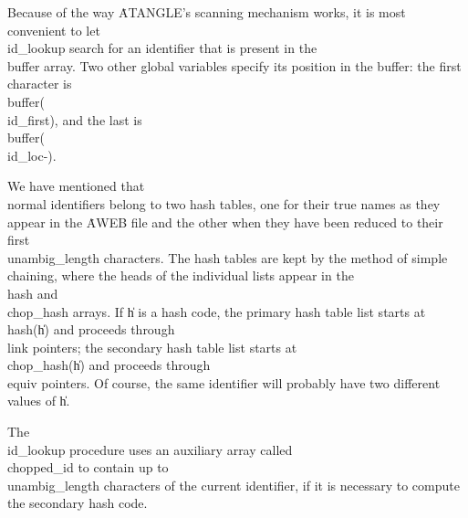 Because of the way \.{ATANGLE}'s scanning mechanism works, it is most
convenient to let \\{id\_lookup} search for an identifier that is present in
the
\\{buffer} array. Two other global variables specify its position in the
buffer: the first character is \\{buffer}\?(\?\\{id\_first}\?)\?, and the last
is
\\{buffer}\?(\?\\{id\_loc}\?-\?)\?.

We have mentioned that \\{normal} identifiers belong to two hash tables, one
for their true names as they appear in the \.{AWEB} file and the other when
they have been reduced to their first \\{unambig\_length} characters. The hash
tables are kept by the method of simple chaining, where the heads of the
individual lists appear in the \\{hash} and \\{chop\_hash} arrays. If \|h is a
hash code, the primary hash table list starts at \\{hash}\?(\?\|h\?)\? and
proceeds
through \\{link} pointers; the secondary hash table list starts at
\\{chop\_hash}\?(\?\|h\?)\? and proceeds through \\{equiv} pointers. Of course,
the same
identifier will probably have two different values of \|h.

The \\{id\_lookup} procedure uses an auxiliary array called \\{chopped\_id} to
contain up to \\{unambig\_length} characters of the current identifier, if
it is necessary to compute the secondary hash code.

